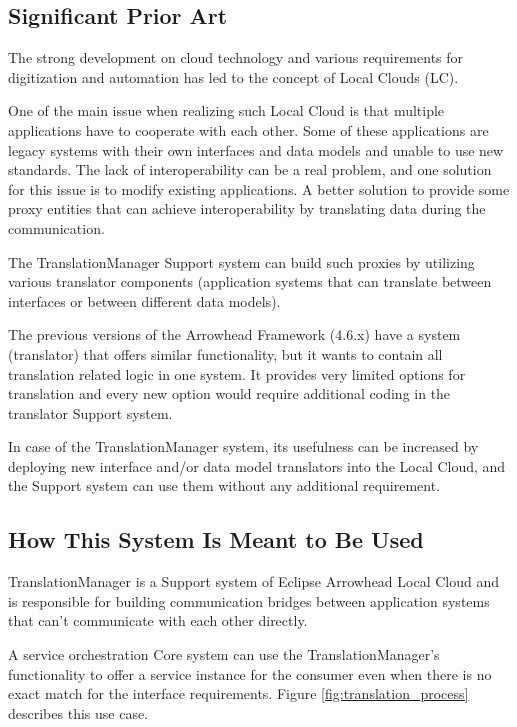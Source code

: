 \documentclass[a4paper]{arrowhead}
\begin{document}
\subsection{Significant Prior Art}
\label{sec:prior_art}

The strong development on cloud technology and various requirements for digitization and automation has led to the concept of Local Clouds (LC).

One of the main issue when realizing such Local Cloud is that multiple applications have to cooperate with each other. Some of these applications are legacy systems with their own interfaces and data models and unable to use new standards. The lack of interoperability can be a real problem, and one solution for this issue is to modify existing applications. A better solution to provide some proxy entities that can achieve interoperability by translating data during the communication.

The TranslationManager Support system can build such proxies by utilizing various translator components (application systems that can translate between interfaces or between different data models).

The previous versions of the Arrowhead Framework (4.6.x) have a system (translator) that offers similar functionality, but it wants to contain all translation related logic in one system. It provides very limited options for translation and every new option would require additional coding in the translator Support system.

In case of the TranslationManager system, its usefulness can be increased by deploying new interface and/or data model translators into the Local Cloud, and the Support system can use them without any additional requirement.

\subsection{How This System Is Meant to Be Used}
\label{sec:use}

TranslationManager is a Support system of Eclipse Arrowhead Local Cloud and is responsible for building communication bridges between application systems that can't communicate with each other directly. 

A service orchestration Core system can use the TranslationManager's functionality to offer a service instance for the consumer even when there is no exact match for the interface requirements. Figure \ref{fig:translation_process} describes this use case.
\end{document}
